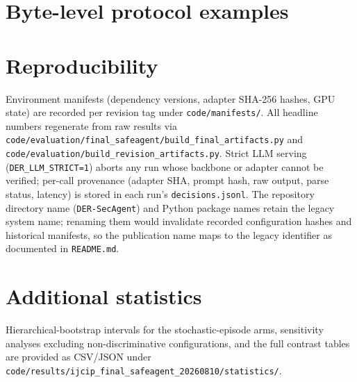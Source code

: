 \documentclass[11pt,a4paper]{article}
\begin{document}
\section{Byte-level protocol examples}


\section{Reproducibility}
\label{sec:supp-repro}
Environment manifests (dependency versions, adapter SHA-256 hashes, GPU
state) are recorded per revision tag under \texttt{code/manifests/}. All
headline numbers regenerate from raw results via
\texttt{code/evaluation/final\_safeagent/build\_final\_artifacts.py} and
\texttt{code/evaluation/build\_revision\_artifacts.py}. Strict LLM
serving (\texttt{DER\_LLM\_STRICT=1}) aborts any run whose backbone or
adapter cannot be verified; per-call provenance (adapter SHA, prompt
hash, raw output, parse status, latency) is stored in each run's
\texttt{decisions.jsonl}. The repository directory name
(\texttt{DER-SecAgent}) and Python package names retain the legacy
system name; renaming them would invalidate recorded configuration
hashes and historical manifests, so the publication name maps to the
legacy identifier as documented in \texttt{README.md}.

\section{Additional statistics}
Hierarchical-bootstrap intervals for the stochastic-episode arms,
sensitivity analyses excluding non-discriminative configurations, and
the full contrast tables are provided as CSV/JSON under
\texttt{code/results/ijcip\_final\_safeagent\_20260810/statistics/}.

\end{document}
